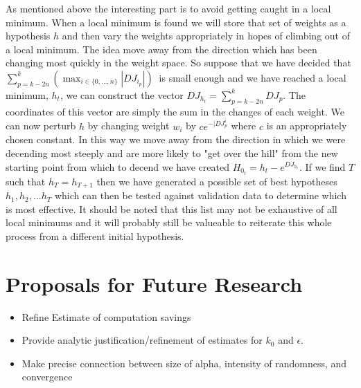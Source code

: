 \documentclass[11pt]{article} %
\begin{document}
As mentioned above the interesting part is to avoid getting caught in a local minimum.  When a local minimum is found we will store that set of weights as a hypothesis $h$ and then vary the weights appropriately in hopes of climbing out of a local minimum.  The idea move away from the direction which has been changing most quickly in the weight space.  So suppose that we have decided that $\sum_{p=k-2n}^{k} \left( \max_{i \in \{0, \dots , n\}} |DJ_{i_{p}}| \right)\ $ is small enough and we have reached a local minimum, $h_{t}$, we can construct the vector
$DJ_{h_{t}} = \sum_{p=k-2n}^{k} DJ_{p}$.  The coordinates of this vector are simply the sum in the changes of each weight.  We can now perturb $h$ by changing weight $w_{i}$ by $ce^{-|DJ_{p}^{i}}$ where $c$ is an appropriately chosen constant.  In this way we move away from the direction in which we were decending most steeply and are more likely to "get over the hill" from the new starting point from which to decend we have created $H_{0_{t}} = h_{t} - e^{DJ_{h_{t}}}$. If we find $T$ such that $h_{T}  = h_{T+1}$ then we have generated a possible set of best hypotheses $h_{1}, h_{2}, ... h_{T}$ which can then be tested against validation data to determine which is most effective. It should be noted that this list may not be exhaustive of all local minimums and it will probably still be valueable to reiterate this whole process from a different initial hypothesis. 


\section{Proposals for Future Research}
\begin{itemize}
\item Refine Estimate of computation savings 

\item Provide analytic justification/refinement of estimates for $k_{0}$ and $\epsilon$. 

\item Make precise connection between size of alpha, intensity of randomness, and convergence

\end{itemize}
\end{document}
